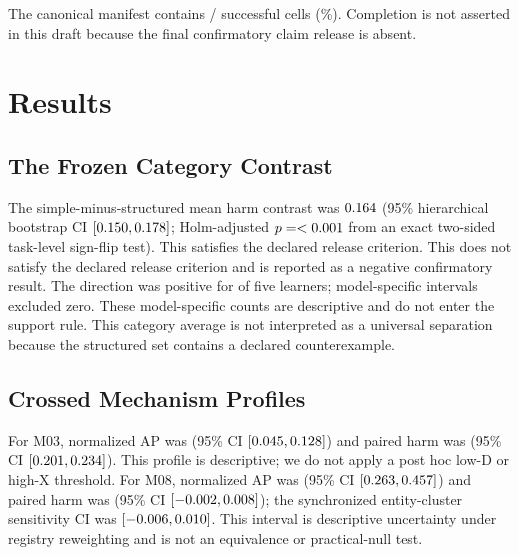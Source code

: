 \documentclass[letterpaper]{article}
\begin{document}
\ifLBResultsReady
The canonical manifest contains \LBSuccessfulCells{}/\LBExpectedCells{}
successful cells (\LBCompletionRate\%).
\else
Completion is not asserted in this draft because the final confirmatory claim
release is absent.
\fi

\section{Results}
\label{sec:results}
\ifLBResultsReady
\subsection{The Frozen Category Contrast}
The simple-minus-structured mean harm contrast was
$0.164$ (95\% hierarchical bootstrap CI
$[0.150,0.178]$; Holm-adjusted
$p=<0.001$ from an exact two-sided task-level sign-flip test).
\ifLBSimpleStructuredSupported
This satisfies the declared release criterion.
\else
This does not satisfy the declared release criterion and is reported as a
negative confirmatory result.
\fi
The direction was positive for \LBModelPositiveDirectionCount{} of five
learners; \LBModelCIExcludesZeroCount{} model-specific intervals excluded zero.
These model-specific counts are descriptive and do not enter the support rule.
This category average is not interpreted as a universal separation because the
structured set contains a declared counterexample.

\subsection{Crossed Mechanism Profiles}
For M03, normalized AP was \LBMThreeDetectability{} (95\% CI
$[0.045,0.128]$) and paired harm
was \LBMThreeHarm{} (95\% CI
$[0.201,0.234]$).  This profile is descriptive;
we do not apply a post hoc low-D or high-X threshold.
For M08, normalized AP was \LBMEightDetectability{} (95\% CI
$[0.263,0.457]$) and paired harm
was \LBMEightHarm{} (95\% CI
$[-0.002,0.008]$); the synchronized entity-cluster sensitivity CI
was $[-0.006,0.010]$.
This interval is descriptive uncertainty under registry reweighting and is not
an equivalence or practical-null test.
\end{document}
